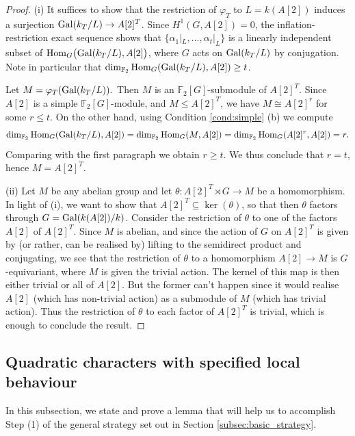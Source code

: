 \documentclass[10pt]{amsart}
\numberwithin{equation}{section}
\theoremstyle{remark}
\theoremstyle{definition}
\theoremstyle{definition}
\theoremstyle{definition}
\theoremstyle{definition}
\theoremstyle{definition}
\theoremstyle{definition}
\theoremstyle{definition}
\theoremstyle{definition}
\begin{document}
\begin{proof}
(i) It suffices to show that the restriction of $\varphi_T$ to $L=k(A[2])$ induces a surjection $\textup{Gal}(k_T/L)\to A[2]^T$.  Since $H^1(G,A[2])=0$, the inflation-restriction exact sequence shows that $\{\alpha_1|_{L},...,\alpha_t|_L\}$ is a linearly independent subset of $\textup{Hom}_G\big(\textup{Gal}(k_T/L),A[2]\big)$, where $G$ acts on $\textup{Gal}(k_T/L)$ by conjugation. Note in particular that $\dim_{\mathbb{F}_2}\textup{Hom}_G(\textup{Gal}(k_T/L),A[2])\geq t$.

Let $M=\varphi_T(\textup{Gal}(k_T/L)).$  Then $M$ is an $\mathbb{F}_2[G]$-submodule of $A[2]^T$. Since $A[2]$ is a simple $\mathbb{F}_2[G]$-module, and $M\leq A[2]^T$, we have $M\cong A[2]^r$ for some $r\leq t$. On the other hand, using Condition \ref{cond:simple} (b) we compute
\[\dim_{\mathbb{F}_2}\textup{Hom}_G(\textup{Gal}(k_T/L),A[2])=\dim_{\mathbb{F}_2}\textup{Hom}_G(M,A[2])=\dim_{\mathbb{F}_2}\textup{Hom}_G(A[2]^r,A[2])=r.\]
Comparing with the first paragraph we obtain $r\geq t$. We thus conclude that $r=t$, hence $M=A[2]^T$.

(ii) Let $M$ be any abelian group and let $\theta: A[2]^T\rtimes G\to M$ be a homomorphism. In light of (i), we want to show that $A[2]^T\subseteq \ker(\theta)$, so that then $\theta$ factors through $G=\textup{Gal}(k(A[2])/k)$. Consider the restriction of $\theta$ to one of the factors $A[2]$ of $A[2]^T$. Since $M$ is abelian, and since the action of $G$ on $A[2]^T$ is given by (or rather, can be realised by) lifting to the semidirect product and conjugating, we see that the restriction of  $\theta$ to a homomorphism $A[2]\to M$ is $G$-equivariant, where $M$ is given the trivial action. The kernel of this map is then either trivial or all of $A[2]$. But the former can't happen since it would realise $A[2]$ (which has non-trivial action) as a submodule of $M$ (which has trivial action). Thus the restriction of $\theta$ to each factor of $A[2]^T$ is trivial, which is enough to conclude the result.   
\end{proof}

\subsection{Quadratic characters with specified local behaviour}

In this subsection, we state and prove a lemma that will help us  to accomplish Step (1) of the general strategy set out in Section \ref{subsec:basic_strategy}. 
\end{document}
